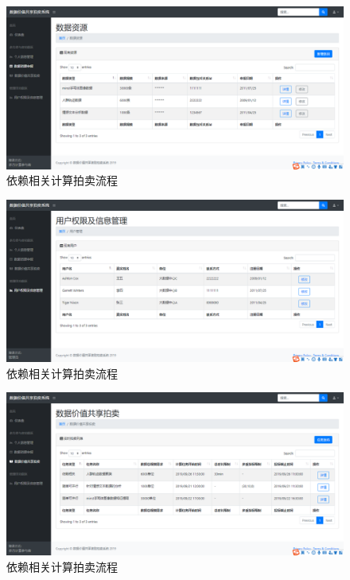 \documentclass[promaster]{thesis-uestc}
\begin{document}
\begin{figure}[H]
    \includegraphics[width=400pt]{ui/ziyuanshenbao.png}
    \caption{依赖相关计算拍卖流程}
\end{figure}
\begin{figure}[H]
    \includegraphics[width=400pt]{ui/yonghuguanli.png}
    \caption{依赖相关计算拍卖流程}
\end{figure}
\begin{figure}[H]
    \includegraphics[width=400pt]{ui/paimai.png}
    \caption{依赖相关计算拍卖流程}
\end{figure}
\end{document}
